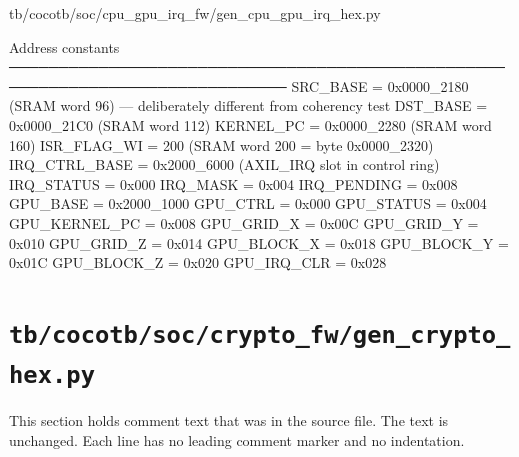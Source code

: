 \begin{relocated}{tb/cocotb/soc/cpu_gpu_irq_fw/gen_cpu_gpu_irq_hex.py}
\begin{textblock}
Address constants
──────────────────────────────────────────────────────────────────────────────
SRC_BASE    = 0x0000_2180  (SRAM word 96)  — deliberately different from coherency test
DST_BASE    = 0x0000_21C0  (SRAM word 112)
KERNEL_PC   = 0x0000_2280  (SRAM word 160)
ISR_FLAG_WI = 200           (SRAM word 200 = byte 0x0000_2320)
IRQ_CTRL_BASE = 0x2000_6000  (AXIL_IRQ slot in control ring)
IRQ_STATUS   = 0x000
IRQ_MASK     = 0x004
IRQ_PENDING  = 0x008
GPU_BASE    = 0x2000_1000
GPU_CTRL      = 0x000
GPU_STATUS    = 0x004
GPU_KERNEL_PC = 0x008
GPU_GRID_X    = 0x00C
GPU_GRID_Y    = 0x010
GPU_GRID_Z    = 0x014
GPU_BLOCK_X   = 0x018
GPU_BLOCK_Y   = 0x01C
GPU_BLOCK_Z   = 0x020
GPU_IRQ_CLR   = 0x028
\end{textblock}

\end{relocated}

\section{\texttt{tb/cocotb/soc/crypto\_fw/gen\_crypto\_hex.py}}\label{tm:suite:soc-crypto-fw-gen-crypto-hex}

This section holds comment text that was in the source file. The text is unchanged. Each line has no leading comment marker and no indentation.

